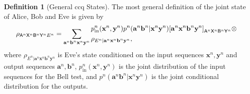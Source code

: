 \documentclass[10pt, a4paper]{article}
\numberwithin{equation}{section} %
\newcounter{stmt} %
\theoremstyle{definition}
\newtheorem{defn}[stmt]{Definition}
\theoremstyle{plain}
\newcommand{\restatableeq}[3]{\label{#3}#2\gdef#1{#2\tag{\ref{#3}}}} %
\newcommand{\?}{\mathrel{?}} %
\newcommand{\cvec}[1]{\boldsymbol{\mathbf{#1}}}    %
\newcommand{\crv}[1]{\mathsf{#1}}
\newcommand{\proj}[2][]{{[#2]}_{#1}}
\newcommand{\prin}[1][p]{#1_{\mathrm{in}}}
\begin{document}
    \begin{defn}[General ccq States]\label{def:ccq_belltest}
      The most general definition of the joint state of Alice, Bob and Eve is given by
      \begin{equation}
        \restatableeq{\bellccq}{
          \rho_{\crv{A}^n\crv{X}^n \crv{B}^n\crv{Y}^n E^n} = \sum_{\cvec{a}^n\cvec{b}^n \cvec{x}^n\cvec{y}^n} \begin{aligned}[c]
          & \prin^n(\cvec{x}^n,\cvec{y}^n) p^n(\cvec{a}^n\cvec{b}^n|\cvec{x}^n\cvec{y}^n) \proj[\crv{A}^n\crv{X}^n \crv{B}^n\crv{Y}^n]{\cvec{a}^n\cvec{x}^n \cvec{b}^n\cvec{y}^n} \otimes \\
            & \rho_{E^n|\cvec{a}^n\cvec{x}^n \cvec{b}^n\cvec{y}^n},
          \end{aligned}
        }{eqn:bellccq}
      \end{equation}
      where \(\rho_{E^n|\cvec{a}^n\cvec{x}^n \cvec{b}^n\cvec{y}^n}\) is Eve's state conditioned on the input sequences \(\cvec{x}^n, \cvec{y}^n\) and output sequences \(\cvec{a}^n, \cvec{b}^n\), \(\prin^n(\cvec{x}^n, \cvec{y}^n)\) is the joint distribution of the input sequences for the Bell test, and \(p^n(\cvec{a}^n \cvec{b}^n|\cvec{x}^n \cvec{y}^n)\) is the joint conditional distribution for the outputs.
    \end{defn}
\end{document}
